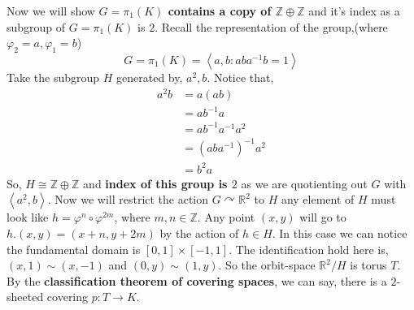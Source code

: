 \documentclass[11pt]{article}
\newcommand{\bb}[1]{\mathbb{#1}}
\newcommand{\Z}{\bb{Z}}
\newcommand{\R}{\mathbb{R}}
\newcommand{\inp}[2]{\left\langle {#1}, {#2} \right\rangle}
\begin{document}
\noindent Now we will show \textbf{$G = \pi_1(K)$ contains a copy of $\Z \oplus \Z$} and it's index as a subgroup of $G = \pi_1(K)$ is $2$. Recall the representation of the group,(where $\varphi_2 =a,\varphi_1=b$) $$G=\pi_1(K) = \inp{a}{b : aba^{-1}b = 1}$$
Take the subgroup $H$ generated by, $a^2,b$. Notice that, \begin{align*}
    a^2b & = a(ab) \\
    &= ab^{-1}a \\
    &= ab^{-1}a^{-1}a^2 \\
    &= (aba^{-1})^{-1}a^2\\
    &= b^2a
\end{align*}
So, $H \cong \Z \oplus \Z$ and \textbf{index of this group is $2$} as we are quotienting out $G$ with $\inp{a^2}{b}$. Now we will restrict the action $G \curvearrowright \R^2$ to $H$ any element of $H$ must look like $h=\varphi^{n} \circ \varphi^{2m}$, where $m,n \in \Z$. Any point $(x,y)$ will go to $h.(x,y) = (x+n,y+2m)$ by the action of $h \in H$. In this case we can notice the fundamental domain is $[0,1]\times [-1,1]$. The identification hold here is, $(x,1)\sim (x,-1)$ and $(0,y)\sim (1,y)$. So the orbit-space $\R^2 / H$ is torus $T$. By the \textbf{\textsf{classification theorem of covering spaces}}, we can say, there is a $2$-sheeted covering $p:T \to K$. 
\end{document}

